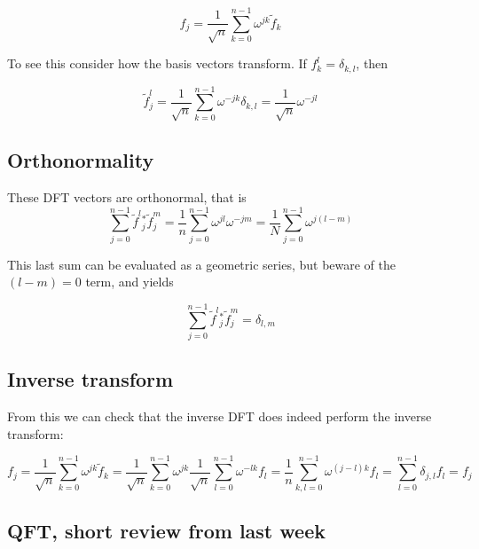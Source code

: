 \documentclass[%
oneside,                 %
final,                   %
10pt]{article}
\begin{document}
\begin{equation*}
f_{j}=\frac{1}{\sqrt{n}} \sum_{k=0}^{n-1} \omega^{j k} \tilde{f}_{k}
\end{equation*}

To see this consider how the basis vectors transform. If $f_{k}^{l}=\delta_{k, l}$, then

\begin{equation*}
\tilde{f}_{j}^{l}=\frac{1}{\sqrt{n}} \sum_{k=0}^{n-1} \omega^{-j k} \delta_{k, l}=\frac{1}{\sqrt{n}} \omega^{-j l}
\end{equation*}

\subsection{Orthonormality}

These DFT vectors are orthonormal, that is
\begin{equation*}
\sum_{j=0}^{n-1} \tilde{f}^{l}{ }_{j}^{*} \tilde{f}_{j}^{m}=\frac{1}{n} \sum_{j=0}^{n-1} \omega^{j l} \omega^{-j m}=\frac{1}{N} \sum_{j=0}^{n-1} \omega^{j(l-m)} 
\end{equation*}

This last sum can be evaluated as a geometric series, but beware of the $(l-m)=0$ term, and yields

\begin{equation*}
\sum_{j=0}^{n-1} \tilde{f}^{l}{ }_{j}^{*} \tilde{f}_{j}^{m}=\delta_{l, m}
\end{equation*}

\subsection{Inverse transform}

From this we can check that the inverse DFT does indeed perform the inverse transform:

\begin{equation*}
f_{j}=\frac{1}{\sqrt{n}} \sum_{k=0}^{n-1} \omega^{j k} \tilde{f}_{k}=\frac{1}{\sqrt{n}} \sum_{k=0}^{n-1} \omega^{j k} \frac{1}{\sqrt{n}} \sum_{l=0}^{n-1} \omega^{-l k} f_{l}=\frac{1}{n} \sum_{k, l=0}^{n-1} \omega^{(j-l) k} f_{l}=\sum_{l=0}^{n-1} \delta_{j, l} f_{l}=f_{j} 
\end{equation*}

\subsection{QFT, short review from last week}
\end{document}
